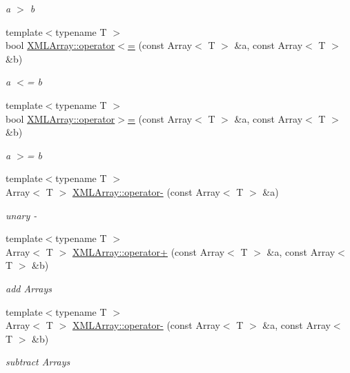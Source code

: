 \begin{DoxyCompactItemize}
\begin{DoxyCompactList}\small\item\em a $>$ b \end{DoxyCompactList}\item 
{\footnotesize template$<$typename T $>$ }\\bool \mbox{\hyperlink{namespaceXMLArray_a874058edffc8dde49083322f99229c95}{X\+M\+L\+Array\+::operator$<$=}} (const Array$<$ T $>$ \&a, const Array$<$ T $>$ \&b)
\begin{DoxyCompactList}\small\item\em a $<$= b \end{DoxyCompactList}\item 
{\footnotesize template$<$typename T $>$ }\\bool \mbox{\hyperlink{namespaceXMLArray_a77b282c1c52b2e07215ed808a0646e10}{X\+M\+L\+Array\+::operator$>$=}} (const Array$<$ T $>$ \&a, const Array$<$ T $>$ \&b)
\begin{DoxyCompactList}\small\item\em a $>$= b \end{DoxyCompactList}\item 
{\footnotesize template$<$typename T $>$ }\\Array$<$ T $>$ \mbox{\hyperlink{namespaceXMLArray_a1d51bbb3ee59a78dd9e705ecd3db1571}{X\+M\+L\+Array\+::operator-\/}} (const Array$<$ T $>$ \&a)
\begin{DoxyCompactList}\small\item\em unary -\/ \end{DoxyCompactList}\item 
{\footnotesize template$<$typename T $>$ }\\Array$<$ T $>$ \mbox{\hyperlink{namespaceXMLArray_aaa831f7e352068ed72289b0dd0b9ec4d}{X\+M\+L\+Array\+::operator+}} (const Array$<$ T $>$ \&a, const Array$<$ T $>$ \&b)
\begin{DoxyCompactList}\small\item\em add Arrays \end{DoxyCompactList}\item 
{\footnotesize template$<$typename T $>$ }\\Array$<$ T $>$ \mbox{\hyperlink{namespaceXMLArray_ae8e0bb6934e99151ecdd65abfad39763}{X\+M\+L\+Array\+::operator-\/}} (const Array$<$ T $>$ \&a, const Array$<$ T $>$ \&b)
\begin{DoxyCompactList}\small\item\em subtract Arrays \end{DoxyCompactList}\item 

\end{DoxyCompactItemize}
